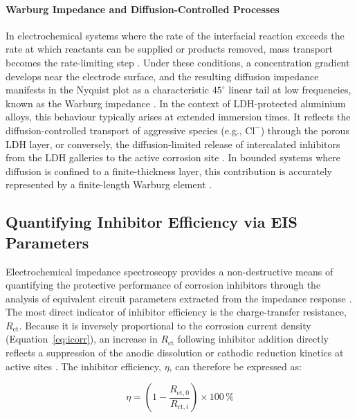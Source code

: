 \documentclass[11pt,twoside,a4paper,final]{report}
\begin{document}
\paragraph{Warburg Impedance and Diffusion-Controlled Processes}
In electrochemical systems where the rate of the interfacial reaction exceeds the rate at which reactants can be supplied or products removed, mass transport becomes the rate-limiting step \cite{Orazem2008, Barsoukov2005}. Under these conditions, a concentration gradient develops near the electrode surface, and the resulting diffusion impedance manifests in the Nyquist plot as a characteristic $45^\circ$ linear tail at low frequencies, known as the Warburg impedance \cite{Orazem2008}. In the context of LDH-protected aluminium alloys, this behaviour typically arises at extended immersion times. It reflects the diffusion-controlled transport of aggressive species (e.g., $\mathrm{Cl}^{-}$) through the porous LDH layer, or conversely, the diffusion-limited release of intercalated inhibitors from the LDH galleries to the active corrosion site \cite{Orazem2008, Huang2018}. In bounded systems where diffusion is confined to a finite-thickness layer, this contribution is accurately represented by a finite-length Warburg element \cite{Barsoukov2005, Huang2018}.

\subsection{Quantifying Inhibitor Efficiency via EIS Parameters}
\label{subsec:inhibitor_efficiency}

Electrochemical impedance spectroscopy provides a non-destructive means of quantifying the protective performance of corrosion inhibitors through the analysis of equivalent circuit parameters extracted from the impedance response \cite{Orazem2008, Lamaka2007}. The most direct indicator of inhibitor efficiency is the charge-transfer resistance, $R_{\text{ct}}$. Because it is inversely proportional to the corrosion current density (Equation~\ref{eq:icorr}), an increase in $R_{\text{ct}}$ following inhibitor addition directly reflects a suppression of the anodic dissolution or cathodic reduction kinetics at active sites \cite{Revie2008, Orazem2008}. The inhibitor efficiency, $\eta$, can therefore be expressed as:

\begin{equation}
    \eta = \left(1 - \frac{R_{\text{ct},0}}{R_{\text{ct},i}}\right) \times 100\,\%
    \label{eq:IE}
\end{equation}
\end{document}
